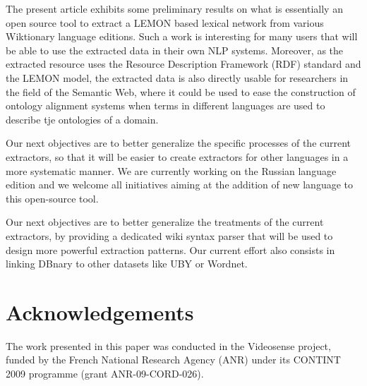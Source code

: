 \documentclass[10pt, a4paper]{article}
\begin{document}
The present article exhibits some preliminary results on what is essentially an open source tool to extract a LEMON based lexical network from various Wiktionary language editions. Such a work is interesting for many users that will be able to use the extracted data in their own NLP systems. Moreover, as the extracted resource uses the Resource Description Framework (RDF) standard and the LEMON model, the extracted data is also directly usable for researchers in the field of the Semantic Web, where it could be used to ease the construction of ontology alignment systems when terms in different languages are used to describe tje ontologies of a domain.

Our next objectives are to better generalize the specific processes of the current extractors, so that it will be easier to create extractors for other languages in a more systematic manner. We are currently working on the Russian language edition and we welcome all initiatives aiming at the addition of new language to this open-source tool.

Our next objectives are to better generalize the treatments of the current extractors, by providing a dedicated wiki syntax parser that will be used to design more powerful extraction patterns. Our current effort also consists in linking DBnary to other datasets like UBY or Wordnet.


\section{Acknowledgements}

The work presented in this paper was conducted in the Videosense project, funded by the French National Research Agency (ANR) under its CONTINT 2009 programme (grant ANR-09-CORD-026).


\end{document}
